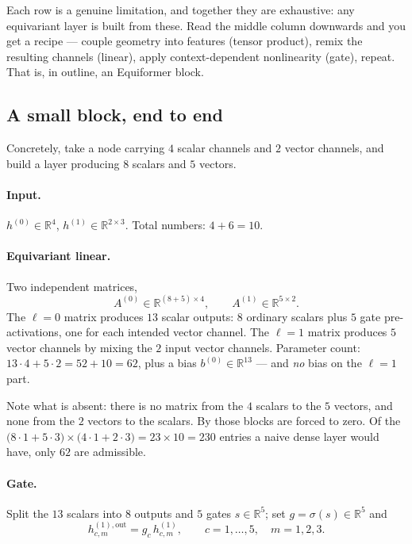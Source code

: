 \documentclass[11pt,a4paper]{report}
\theoremstyle{definition}
\theoremstyle{remark}
\newcommand{\RR}{\mathbb R}
\begin{document}
Each row is a genuine limitation, and together they are exhaustive: any
equivariant layer is built from these. Read the middle column downwards and
you get a recipe --- couple geometry into features (tensor product), remix
the resulting channels (linear), apply context-dependent nonlinearity
(gate), repeat. That is, in outline, an Equiformer block.

\subsection{A small block, end to end}
\label{sec:small-block-example}

Concretely, take a node carrying $4$ scalar channels and $2$ vector
channels, and build a layer producing $8$ scalars and $5$ vectors.

\paragraph{Input.}
$h^{(0)}\in\RR^{4}$, $h^{(1)}\in\RR^{2\times3}$. Total numbers:
$4+6=10$.

\paragraph{Equivariant linear.} Two independent matrices,
\[
A^{(0)}\in\RR^{(8+5)\times4},
\qquad
A^{(1)}\in\RR^{5\times2} .
\]
The $\ell=0$ matrix produces $13$ scalar outputs: $8$ ordinary scalars plus
$5$ gate pre-activations, one for each intended vector channel. The $\ell=1$
matrix produces $5$ vector channels by mixing the $2$ input vector channels.
Parameter count: $13\cdot4+5\cdot2=52+10=62$, plus a bias
$b^{(0)}\in\RR^{13}$ --- and \emph{no} bias on the $\ell=1$ part.

Note what is absent: there is no matrix from the $4$ scalars to the $5$
vectors, and none from the $2$ vectors to the scalars. By
 those blocks are forced to zero. Of
the $\bigl(8\cdot1+5\cdot3\bigr)\times\bigl(4\cdot1+2\cdot3\bigr)=23\times10=230$
entries a naive dense layer would have, only $62$ are admissible.

\paragraph{Gate.} Split the $13$ scalars into $8$ outputs and $5$ gates
$s\in\RR^{5}$; set $g=\sigma(s)\in\RR^{5}$ and
\[
h^{(1),\mathrm{out}}_{c,m}=g_c\,h^{(1)}_{c,m},
\qquad c=1,\dots,5,\quad m=1,2,3 .
\]
\end{document}
